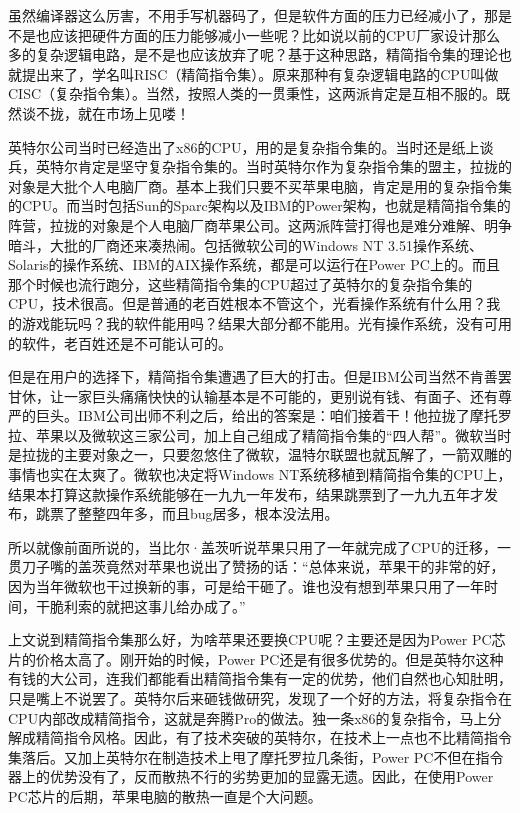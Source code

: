 \documentclass[
  letterpaper,
  DIV=11,
  numbers=noendperiod]{scrreprt}
\begin{document}
虽然编译器这么厉害，不用手写机器码了，但是软件方面的压力已经减小了，那是不是也应该把硬件方面的压力能够减小一些呢？比如说以前的CPU厂家设计那么多的复杂逻辑电路，是不是也应该放弃了呢？基于这种思路，精简指令集的理论也就提出来了，学名叫RISC（精简指令集）。原来那种有复杂逻辑电路的CPU叫做CISC（复杂指令集）。当然，按照人类的一贯秉性，这两派肯定是互相不服的。既然谈不拢，就在市场上见喽！

英特尔公司当时已经造出了x86的CPU，用的是复杂指令集的。当时还是纸上谈兵，英特尔肯定是坚守复杂指令集的。当时英特尔作为复杂指令集的盟主，拉拢的对象是大批个人电脑厂商。基本上我们只要不买苹果电脑，肯定是用的复杂指令集的CPU。而当时包括Sun的Sparc架构以及IBM的Power架构，也就是精简指令集的阵营，拉拢的对象是个人电脑厂商苹果公司。这两派阵营打得也是难分难解、明争暗斗，大批的厂商还来凑热闹。包括微软公司的Windows
NT
3.51操作系统、Solaris的操作系统、IBM的AIX操作系统，都是可以运行在Power
PC上的。而且那个时候也流行跑分，这些精简指令集的CPU超过了英特尔的复杂指令集的CPU，技术很高。但是普通的老百姓根本不管这个，光看操作系统有什么用？我的游戏能玩吗？我的软件能用吗？结果大部分都不能用。光有操作系统，没有可用的软件，老百姓还是不可能认可的。

但是在用户的选择下，精简指令集遭遇了巨大的打击。但是IBM公司当然不肯善罢甘休，让一家巨头痛痛快快的认输基本是不可能的，更别说有钱、有面子、还有尊严的巨头。IBM公司出师不利之后，给出的答案是：咱们接着干！他拉拢了摩托罗拉、苹果以及微软这三家公司，加上自己组成了精简指令集的``四人帮''。微软当时是拉拢的主要对象之一，只要忽悠住了微软，温特尔联盟也就瓦解了，一箭双雕的事情也实在太爽了。微软也决定将Windows
NT系统移植到精简指令集的CPU上，结果本打算这款操作系统能够在一九九一年发布，结果跳票到了一九九五年才发布，跳票了整整四年多，而且bug居多，根本没法用。

所以就像前面所说的，当比尔·盖茨听说苹果只用了一年就完成了CPU的迁移，一贯刀子嘴的盖茨竟然对苹果也说出了赞扬的话：``总体来说，苹果干的非常的好，因为当年微软也干过换新的事，可是给干砸了。谁也没有想到苹果只用了一年时间，干脆利索的就把这事儿给办成了。''

上文说到精简指令集那么好，为啥苹果还要换CPU呢？主要还是因为Power
PC芯片的价格太高了。刚开始的时候，Power
PC还是有很多优势的。但是英特尔这种有钱的大公司，连我们都能看出精简指令集有一定的优势，他们自然也心知肚明，只是嘴上不说罢了。英特尔后来砸钱做研究，发现了一个好的方法，将复杂指令在CPU内部改成精简指令，这就是奔腾Pro的做法。独一条x86的复杂指令，马上分解成精简指令风格。因此，有了技术突破的英特尔，在技术上一点也不比精简指令集落后。又加上英特尔在制造技术上甩了摩托罗拉几条街，Power
PC不但在指令器上的优势没有了，反而散热不行的劣势更加的显露无遗。因此，在使用Power
PC芯片的后期，苹果电脑的散热一直是个大问题。
\end{document}
